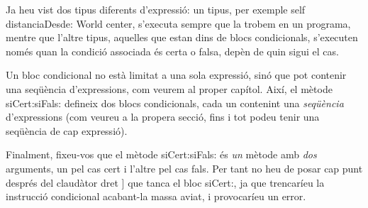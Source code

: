 Ja heu vist dos tipus diferents d'expressió: un tipus, per exemple \textsf{self distanciaDesde: World center}, s'executa sempre que la trobem en un programa, mentre que l'altre tipus, aquelles que estan dins de blocs condicionals, s'executen només quan la condició associada és certa o falsa, depèn de quin sigui el cas.

Un bloc condicional no està limitat a una sola expressió, sinó que pot contenir una seqüència d'expressions, com veurem al proper capítol. Així, el mètode \textsf{siCert:siFals:} defineix dos blocs condicionals, cada un contenint una \emph{seqüència} d'expressions (com veureu a la propera secció, fins i tot podeu tenir una seqüència de cap expressió).

Finalment, fixeu-vos que el mètode \textsf{siCert:siFals:} és \emph{un} mètode amb \emph{dos} arguments, un pel cas cert i l'altre pel cas fals. Per tant no heu de posar cap punt després del claudàtor dret ] que tanca el bloc \textsf{siCert:}, ja que trencaríeu la instrucció condicional acabant-la massa aviat, i provocaríeu un error. 

